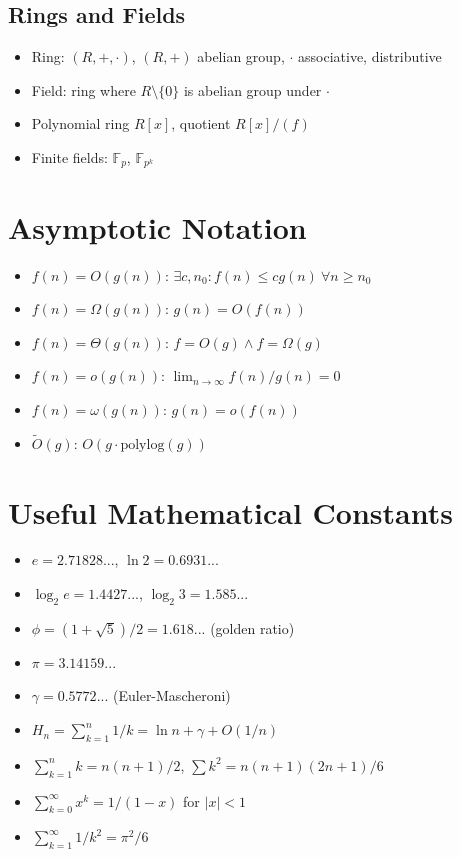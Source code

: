 \subsection{Rings and Fields}
\begin{itemize}
\item Ring: $(R, +, \cdot)$, $(R,+)$ abelian group, $\cdot$ associative, distributive
\item Field: ring where $R\setminus\{0\}$ is abelian group under $\cdot$
\item Polynomial ring $R[x]$, quotient $R[x]/(f)$
\item Finite fields: $\mathbb{F}_p$, $\mathbb{F}_{p^k}$
\end{itemize}

\section{Asymptotic Notation}

\begin{itemize}
\item $f(n) = O(g(n))$: $\exists c,n_0: f(n) \le c g(n) \ \forall n \ge n_0$
\item $f(n) = \Omega(g(n))$: $g(n) = O(f(n))$
\item $f(n) = \Theta(g(n))$: $f = O(g) \land f = \Omega(g)$
\item $f(n) = o(g(n))$: $\lim_{n\to\infty} f(n)/g(n) = 0$
\item $f(n) = \omega(g(n))$: $g(n) = o(f(n))$
\item $\tilde{O}(g)$: $O(g \cdot \mathrm{polylog}(g))$
\end{itemize}

\section{Useful Mathematical Constants}

\begin{itemize}
\item $e = 2.71828...$, $\ln 2 = 0.6931...$
\item $\log_2 e = 1.4427...$, $\log_2 3 = 1.585...$
\item $\phi = (1+\sqrt{5})/2 = 1.618...$ (golden ratio)
\item $\pi = 3.14159...$
\item $\gamma = 0.5772...$ (Euler-Mascheroni)
\item $H_n = \sum_{k=1}^n 1/k = \ln n + \gamma + O(1/n)$
\item $\sum_{k=1}^n k = n(n+1)/2$, $\sum k^2 = n(n+1)(2n+1)/6$
\item $\sum_{k=0}^\infty x^k = 1/(1-x)$ for $|x|<1$
\item $\sum_{k=1}^\infty 1/k^2 = \pi^2/6$
\end{itemize}

